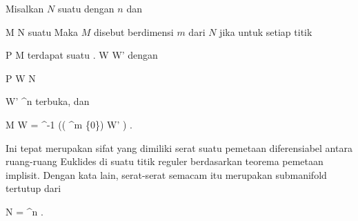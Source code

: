 \setcounter{section}{10}


{}
{

Misalkan $N$ suatu
dengan
$n$ dan

\mavergleichskette
{\vergleichskette
{ M
}
{ \subseteq }{ N
}
{  }{
}
{    }{
}
{   }{
}
}
{}{}{}
suatu
Maka $M$ disebut  berdimensi $m$ dari $N$ jika untuk setiap titik

\mavergleichskette
{\vergleichskette
{ P
}
{ \in }{ M
}
{  }{
}
{    }{
}
{   }{
}
}
{}{}{}
terdapat suatu
 {.} {}
\maabbdisp {\theta} { W } { W'
} {}
dengan

\mavergleichskette
{\vergleichskette
{ P
}
{ \in }{ W
}
{ \subseteq }{ N
}
{    }{
}
{   }{
}
}
{}{}{}

\mavergleichskette
{\vergleichskette
{ W'
}
{ \subseteq }{ \R^n
}
{  }{
}
{    }{
}
{   }{
}
}
{}{}{}
terbuka, dan

\mavergleichskettedisp
{\vergleichskette
{ M \cap W
}
{ =} { \theta^{-1} (( \R^m  \times\{0\}) \cap W' )
}
{ } {
}
{ } {
}
{ } {
}
}
{}{}{.}

}

Ini tepat merupakan sifat yang dimiliki serat suatu pemetaan diferensiabel antara ruang-ruang Euklides di suatu titik reguler berdasarkan
teorema pemetaan implisit.
Dengan kata lain, serat-serat semacam itu merupakan submanifold tertutup dari

\mavergleichskette
{\vergleichskette
{ N
}
{ = }{ \R^n
}
{  }{
}
{    }{
}
{   }{
}
}
{}{}{.}



